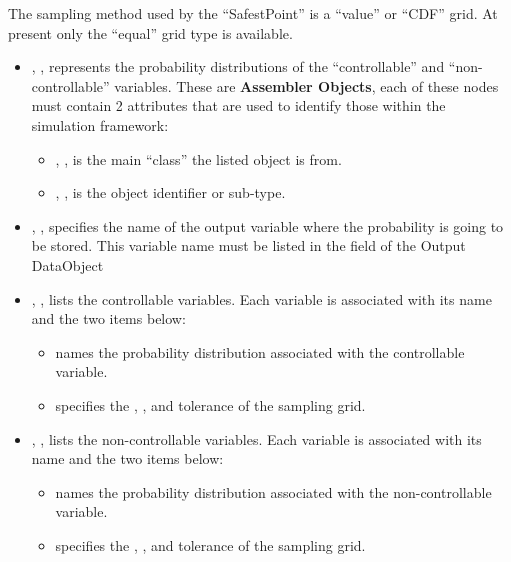 The sampling method used by the ``SafestPoint'' is a ``value'' or ``CDF'' grid.
%
At present only the ``equal'' grid type is available.


\begin{itemize}
  \item {}, , represents the probability
  distributions of the ``controllable'' and ``non-controllable'' variables.
  These are \textbf{Assembler Objects}, each of these nodes must contain 2
  attributes that are used to identify those within the simulation framework:
        \begin{itemize}
    \item {}, , is the main
    ``class'' the listed object is from.
                \item {}, , is the object
    identifier or sub-type.
        \end{itemize}
             \item  {}, , specifies the name of the output variable where the probability is going to be stored.
               \nb This variable name must be listed in the  field of the Output DataObject
        \item {}, ,  lists the controllable variables.
  Each variable is associated with its name and the two items below:
        \begin{itemize}
                \item {} names the probability distribution associated
    with the controllable variable.
                \item {} specifies the , , and
    tolerance of the sampling grid.
        \end{itemize}
        \item {}, , lists the non-controllable variables.
  Each variable is associated with its name and the two items below:
        \begin{itemize}
                \item {} names the probability distribution associated
    with the non-controllable variable.
                \item {} specifies the , , and
    tolerance of the sampling grid.
                \end{itemize}
\end{itemize}

